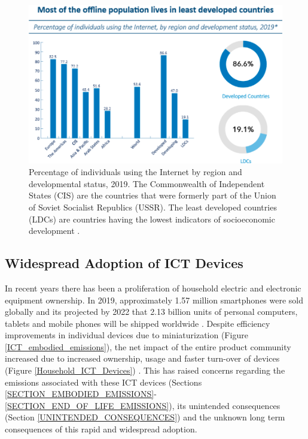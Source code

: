 \documentclass{article}
\begin{document}
\begin{figure}[h]
    \includegraphics[width=.7 \textwidth]{./images/internet_usage_geography.png}
    \centering
    \caption{Percentage of individuals using the Internet by region and developmental status, 2019. The Commonwealth of Independent States (CIS) are the countries that were formerly part of the Union of Soviet Socialist Republics (USSR). The least developed countries (LDCs) are countries having the lowest indicators of socioeconomic development \cite{ITU2019statistics}.}
    \label{Internet_Usage_geography}
\end{figure}


\cleardoublepage
\subsection{Widespread Adoption of ICT Devices} \label{SECTION_WIDESPREAD_ADOPTION_OF_ICT}

In recent years there has been a proliferation of household electric and electronic equipment ownership. In 2019, approximately 1.57 million smartphones were sold globally \cite{statista2021phones} and its projected by 2022 that 2.13 billion units of personal computers, tablets and mobile phones will be shipped worldwide \cite{statista2021electronicsship}. Despite efficiency improvements in individual devices due to miniaturization (Figure \ref{ICT_embodied_emissions}), the net impact of the entire product community increased due to increased ownership, usage and faster turn-over of devices (Figure \ref{Household_ICT_Devices}) \cite{ryen2015consumption}. This has raised concerns regarding the emissions associated with these ICT devices (Sections \ref{SECTION_EMBODIED_EMISSIONS}-\ref{SECTION_END_OF_LIFE_EMISSIONS}), its unintended consequences (Section \ref{UNINTENDED_CONSEQUENCES}) and the unknown long term consequences of this rapid and widespread adoption.
\end{document}
